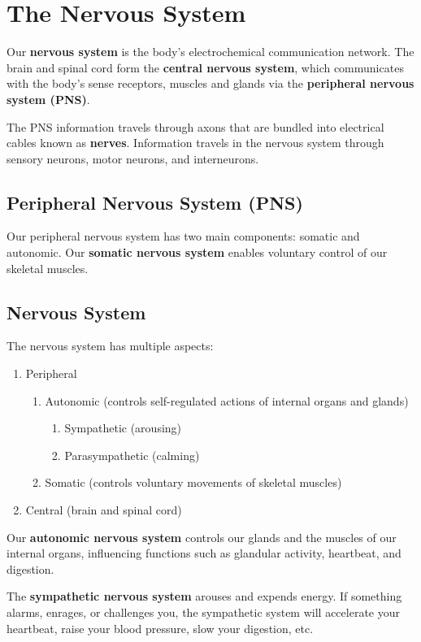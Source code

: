 \documentclass[12pt]{article}
\begin{document}
\section*{The Nervous System}
Our \textbf{nervous system} is the body's electrochemical communication network. The brain and spinal cord form the \textbf{central nervous system}, which communicates with the body's sense receptors, muscles and glands via the \textbf{peripheral nervous system (PNS)}. 

The PNS information travels through axons that are bundled into electrical cables known as \textbf{nerves}. Information travels in the nervous system through sensory neurons, motor neurons, and interneurons.

\subsection*{Peripheral Nervous System (PNS)}
Our peripheral nervous system has two main components: somatic and autonomic. Our \textbf{somatic nervous system} enables voluntary control of our skeletal muscles.

\subsection*{Nervous System}
The nervous system has multiple aspects:
\begin{enumerate}
\item Peripheral
  \begin{enumerate}
  \item Autonomic (controls self-regulated actions of internal organs and glands)
    \begin{enumerate}
    \item Sympathetic (arousing)
    \item Parasympathetic (calming)
    \end{enumerate}
  \item Somatic (controls voluntary movements of skeletal muscles)
  \end{enumerate}
\item Central (brain and spinal cord)
\end{enumerate}
    
Our \textbf{autonomic nervous system} controls our glands and the muscles of our internal organs, influencing functions such as glandular activity, heartbeat, and digestion. 

The \textbf{sympathetic nervous system} arouses and expends energy. If something alarms, enrages, or challenges you, the sympathetic system will accelerate your heartbeat, raise your blood pressure, slow your digestion, etc.
\end{document}
